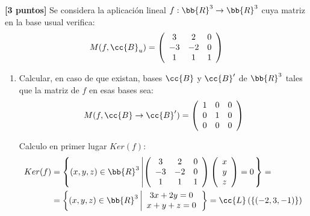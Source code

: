 \documentclass[12pt]{article}
\begin{document}
\begin{ejercicio}\textbf{[3 puntos]}
    Se considera la aplicación lineal $f:\bb{R}^3 \to \bb{R}^3$ cuya matriz en la base usual verifica:
    \begin{equation*}
        M(f,\cc{B}_u)=\left(\begin{array}{ccc}
            3 & 2 & 0 \\
            -3 & -2 & 0 \\
            1 & 1 & 1 \\
        \end{array}\right)
    \end{equation*}

    \begin{enumerate}
        \item Calcular, en caso de que existan, bases $\cc{B}$ y $\cc{B}'$ de $\bb{R}^3$ tales que la matriz de $f$ en esas bases sea:
        \begin{equation*}
            M(f, \cc{B}\to \cc{B}')=
                \left(\begin{array}{ccc}
                1 & 0 & 0 \\
                0 & 1 & 0 \\
                0 & 0 & 0 \\
            \end{array}\right)
        \end{equation*}

        Calculo en primer lugar $Ker(f)$:
        \begin{equation*}\begin{split}
            Ker(f)&= \left\{(x,y,z)\in \bb{R}^3 \left|
            \left(\begin{array}{ccc}
                3 & 2 & 0 \\
                -3 & -2 & 0 \\
                1 & 1 & 1 \\
            \end{array}\right)
            \left(\begin{array}{c}
                x \\ y \\ z
            \end{array}\right) = 0
            \right.\right\} =\\
            &= \left\{(x,y,z)\in \bb{R}^3 \left|
            \begin{array}{c}
                3x+2y=0\\
                x+y+z=0
            \end{array}
            \right.\right\}
            = \cc{L}\left(\left\{(-2,3,-1)\right\}\right)
        \end{split}\end{equation*}


\end{enumerate}
\end{ejercicio}
\end{document}

